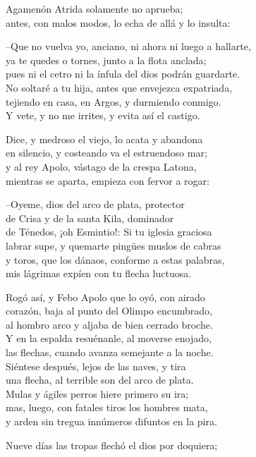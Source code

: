 Agamenón Atrida solamente no aprueba;\\
antes, con malos modos, lo echa de allá y lo insulta:\par
--Que no vuelva yo, anciano, ni ahora ni luego a hallarte,\\
ya te quedes o tornes, junto a la flota anclada;\\
pues ni el cetro ni la ínfula del dios podrán guardarte.\\
No soltaré a tu hija, antes que envejezca expatriada,\\
tejiendo en casa, en Argos, y durmiendo conmigo.\\
Y vete, y no me irrites, y evita así el castigo.\par
Dice, y medroso el viejo, lo acata y abandona\\
en silencio, y costeando va el estruendoso mar;\\
y al rey Apolo, vástago de la crespa Latona,\\
mientras se aparta, empieza con fervor a rogar:\par
--Oyeme, dios del arco de plata, protector\\
de Crisa y de la santa Kila, dominador\\
de Ténedos, ¡oh Esmintio!: Si tu iglesia graciosa\\
labrar supe, y quemarte pingües muslos de cabras\\
y toros, que los dánaos, conforme a estas palabras,\\
mis lágrimas expíen con tu flecha luctuosa.\par
Rogó así, y Febo Apolo que lo oyó, con airado\\
corazón, baja al punto del Olimpo encumbrado,\\
al hombro arco y aljaba de bien cerrado broche.\\
Y en la espalda resuénanle, al moverse enojado,\\
las flechas, cuando avanza semejante a la noche.\\
Siéntese después, lejos de las naves, y tira\\
una flecha, al terrible son del arco de plata.\\
Mulas y ágiles perros hiere primero su ira;\\
mas, luego, con fatales tiros los hombres mata,\\
y arden sin tregua innúmeros difuntos en la pira.\par
Nueve días las tropas flechó el dios por doquiera;\\
